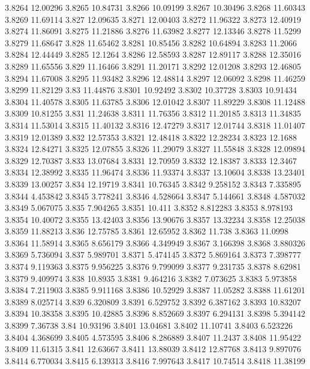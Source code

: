 3.8264  12.00296
3.8265  10.84731
3.8266  10.09199
3.8267  10.30496
3.8268  11.60343
3.8269  11.69114
3.827  12.09635
3.8271  12.00403
3.8272  11.96322
3.8273  12.40919
3.8274  11.86091
3.8275  11.21886
3.8276  11.63982
3.8277  12.13346
3.8278  11.5299
3.8279  11.68647
3.828  11.65462
3.8281  10.85456
3.8282  10.64894
3.8283  11.2066
3.8284  12.44449
3.8285  12.1264
3.8286  12.58593
3.8287  12.89117
3.8288  12.35016
3.8289  11.65556
3.829  11.16466
3.8291  11.20171
3.8292  12.01208
3.8293  12.46805
3.8294  11.67008
3.8295  11.93482
3.8296  12.48814
3.8297  12.06092
3.8298  11.46259
3.8299  11.82129
3.83  11.44876
3.8301  10.92492
3.8302  10.37728
3.8303  10.91434
3.8304  11.40578
3.8305  11.63785
3.8306  12.01042
3.8307  11.89229
3.8308  11.12488
3.8309  10.81255
3.831  11.24638
3.8311  11.76356
3.8312  11.20185
3.8313  11.34835
3.8314  11.53014
3.8315  11.40132
3.8316  12.47279
3.8317  12.01744
3.8318  11.01407
3.8319  12.01389
3.832  12.57353
3.8321  12.48418
3.8322  12.28234
3.8323  12.1688
3.8324  12.84271
3.8325  12.07855
3.8326  11.29079
3.8327  11.55848
3.8328  12.09894
3.8329  12.70387
3.833  13.07684
3.8331  12.70959
3.8332  12.18387
3.8333  12.3467
3.8334  12.38992
3.8335  11.96474
3.8336  11.93374
3.8337  13.10604
3.8338  13.23401
3.8339  13.00257
3.834  12.19719
3.8341  10.76345
3.8342  9.258152
3.8343  7.335895
3.8344  4.453842
3.8345  3.778241
3.8346  4.528664
3.8347  5.144661
3.8348  4.587032
3.8349  5.067075
3.835  7.904265
3.8351  10.411
3.8352  8.812283
3.8353  8.978193
3.8354  10.40072
3.8355  13.42403
3.8356  13.90676
3.8357  13.32234
3.8358  12.25038
3.8359  11.88213
3.836  12.75785
3.8361  12.65952
3.8362  11.738
3.8363  11.0998
3.8364  11.58914
3.8365  8.656179
3.8366  4.349949
3.8367  3.166398
3.8368  3.880326
3.8369  5.736094
3.837  5.989701
3.8371  5.474145
3.8372  5.869164
3.8373  7.398777
3.8374  9.119363
3.8375  9.956225
3.8376  9.799099
3.8377  9.231735
3.8378  8.62981
3.8379  9.409974
3.838  10.8935
3.8381  9.464216
3.8382  7.073625
3.8383  5.973858
3.8384  7.211903
3.8385  9.911168
3.8386  10.52929
3.8387  11.05282
3.8388  11.61201
3.8389  8.025714
3.839  6.320809
3.8391  6.529752
3.8392  6.387162
3.8393  10.83207
3.8394  10.38358
3.8395  10.42885
3.8396  8.852669
3.8397  6.294131
3.8398  5.394142
3.8399  7.36738
3.84  10.93196
3.8401  13.04681
3.8402  11.10741
3.8403  6.523226
3.8404  4.368699
3.8405  4.573595
3.8406  8.286889
3.8407  11.2437
3.8408  11.95422
3.8409  11.61315
3.841  12.63667
3.8411  13.88039
3.8412  12.87768
3.8413  9.897076
3.8414  6.770034
3.8415  6.139313
3.8416  7.997643
3.8417  10.74514
3.8418  11.38199
